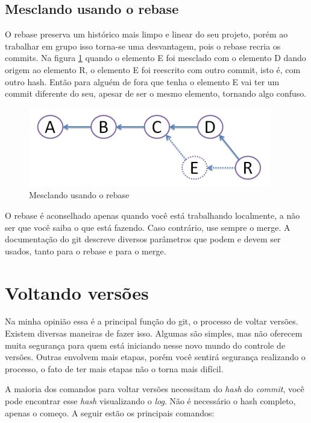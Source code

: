 \documentclass[12pt,openright,oneside,a4paper,english,brazil]{abntex2}
\begin{document}
\subsection{Mesclando usando o rebase}

O rebase preserva um histórico mais limpo e linear do seu projeto, porém ao trabalhar em grupo isso torna-se uma desvantagem, pois o rebase recria os commits. Na figura \ref{rebase} quando o elemento E foi mesclado com o elemento D dando origem ao elemento R, o elemento E foi reescrito com outro commit, isto é, com outro hash. Então para alguém de fora que tenha o elemento E vai ter um commit diferente do seu, apesar de ser o mesmo elemento, tornando algo confuso.

\begin{figure}[H]
	\caption{\label{rebase}Mesclando usando o rebase}
	\begin{center}
		\includegraphics[width=0.5\linewidth]{rebase}
	\end{center}
\end{figure}

O rebase é aconselhado apenas quando você está trabalhando localmente, a não ser que você saiba o que está fazendo. Caso contrário, use sempre o merge. A documentação do git descreve diversos parâmetros que podem e devem ser usados, tanto para o rebase e para o merge.

\section{Voltando versões}

Na minha opinião essa é a principal função do git, o processo de voltar versões. Existem diversas maneiras de fazer isso. Algumas são simples, mas não oferecem muita segurança para quem está iniciando nesse novo mundo do controle de versões. Outras envolvem mais etapas, porém você sentirá segurança realizando o processo,  o fato de ter mais etapas não o torna mais difícil.

A maioria dos comandos para voltar versões necessitam do \textit{hash} do \textit{commit}, você pode encontrar esse \textit{hash} visualizando o \textit{log}. Não é necessário o hash completo, apenas o começo. A seguir estão os principais comandos:
\end{document}
